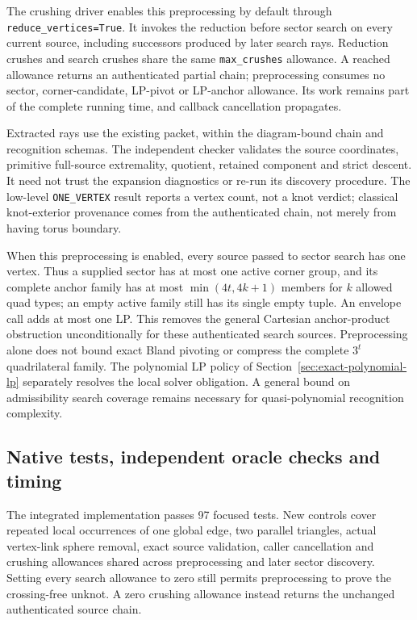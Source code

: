 The crushing driver enables this preprocessing by default through
\texttt{reduce\_vertices=True}.  It invokes the reduction before sector
search on every current source, including
successors produced by later search rays.  Reduction crushes and search
crushes share the same \texttt{max\_crushes} allowance.  A reached allowance
returns an authenticated partial chain; preprocessing consumes no sector,
corner-candidate, LP-pivot or LP-anchor allowance.  Its work remains part
of the complete running time, and callback cancellation propagates.

Extracted rays use the existing  packet,
within the diagram-bound chain and recognition schemas.  The independent checker
validates the source coordinates, primitive full-source extremality,
quotient, retained component and strict descent.  It need not trust the
expansion diagnostics or re-run its discovery procedure.  The low-level
\texttt{ONE\_VERTEX} result reports a vertex count, not a knot verdict;
classical knot-exterior provenance comes from the authenticated chain,
not merely from having torus boundary.

When this preprocessing is enabled, every source passed to sector search
has one vertex.  Thus a supplied sector has at most one active corner
group, and its complete anchor family has at most
$\min(4t,4k+1)$ members for $k$ allowed quad types; an empty active family
still has its single empty tuple.  An envelope call adds at most one LP.
This removes the general Cartesian anchor-product obstruction
unconditionally for these authenticated search sources.  Preprocessing
alone does not bound exact Bland pivoting or compress the complete $3^t$
quadrilateral family.  The polynomial LP policy of
Section~\ref{sec:exact-polynomial-lp} separately resolves the local solver
obligation.  A general bound on admissibility search coverage remains
necessary for quasi-polynomial recognition complexity.

\subsection{Native tests, independent oracle checks and timing}

The integrated implementation passes 97 focused tests.  New controls cover
repeated local occurrences of one global edge, two parallel triangles,
actual vertex-link sphere removal, exact source validation, caller
cancellation and crushing allowances shared across preprocessing and later
sector discovery.  Setting every search allowance to zero still permits
preprocessing to prove the crossing-free unknot.  A zero crushing allowance
instead returns the unchanged authenticated source chain.

